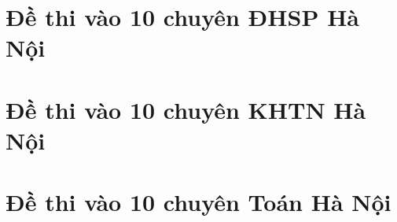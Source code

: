 \documentclass[12pt,a4paper,oneside]{book}
\begin{document}
\chapter{Đề thi vào 10 chuyên ĐHSP Hà Nội}

\newpage
\newpage
\newpage
\newpage
\newpage
\newpage
\chapter{Đề thi vào 10 chuyên KHTN Hà Nội}

\newpage
\newpage
\newpage
\newpage
\chapter{Đề thi vào 10 chuyên Toán Hà Nội}

\newpage
\newpage
\newpage
\newpage
\newpage
\end{document}
